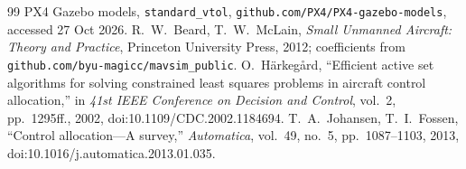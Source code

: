 \documentclass[preprint,12pt,a4paper]{elsarticle}
\begin{document}
\begin{thebibliography}{99}
 PX4 Gazebo models, \texttt{standard\_vtol}, \texttt{github.com/PX4/PX4-gazebo-models}, accessed 27 Oct 2026.
 R.~W.~Beard, T.~W.~McLain, \emph{Small Unmanned Aircraft: Theory and Practice}, Princeton University Press, 2012; coefficients from \texttt{github.com/byu-magicc/mavsim\_public}.
 O.~H\"{a}rkeg\aa{}rd, ``Efficient active set algorithms for solving constrained least squares problems in aircraft control allocation,'' in \emph{41st IEEE Conference on Decision and Control}, vol.~2, pp.~1295ff., 2002, doi:10.1109/CDC.2002.1184694.
 T.~A.~Johansen, T.~I.~Fossen, ``Control allocation---A survey,'' \emph{Automatica}, vol.~49, no.~5, pp.~1087--1103, 2013, doi:10.1016/j.automatica.2013.01.035.
\end{thebibliography}
\end{document}
